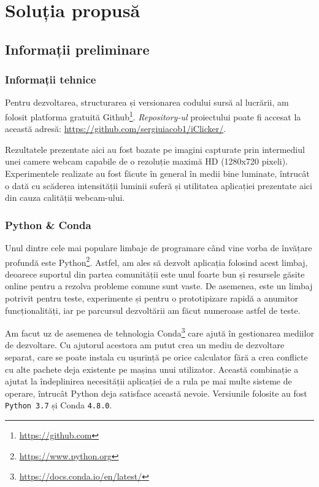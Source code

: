 \chapter{Soluția propusă}
\label{chapter2}
\section{Informații preliminare}
\subsection{Informații tehnice}
Pentru dezvoltarea, structurarea și versionarea codului sursă al lucrării, am folosit platforma gratuită Github\footnote{\url{https://github.com}}.
\emph{Repository-ul} proiectului poate fi accesat la această adresă: \url{https://github.com/sergiuiacob1/iClicker/}.

Rezultatele prezentate aici au fost bazate pe imagini capturate prin intermediul unei camere webcam capabile de o rezoluție maximă HD (1280x720 pixeli).
Experimentele realizate au fost făcute în general în medii bine luminate, întrucât o dată cu scăderea intensității luminii suferă și utilitatea aplicației prezentate aici din cauza calității webcam-ului.

\subsection{Python \& Conda}
Unul dintre cele mai populare limbaje de programare când vine vorba de învățare profundă este Python\footnote{\url{https://www.python.org}}.
Astfel, am ales să dezvolt aplicația folosind acest limbaj, deoarece suportul din partea comunității este unul foarte bun și resursele găsite online pentru a rezolva probleme comune sunt vaste.
De asemenea, este un limbaj potrivit pentru teste, experimente și pentru o prototipizare rapidă a anumitor funcționalități, iar pe parcursul dezvoltării am făcut numeroase astfel de teste.

Am facut uz de asemenea de tehnologia Conda\footnote{\url{https://docs.conda.io/en/latest/}} care ajută în gestionarea mediilor de dezvoltare.
Cu ajutorul acestora am putut crea un mediu de dezvoltare separat, care se poate instala cu ușurință pe orice calculator fără a crea conflicte cu alte pachete deja existente pe mașina unui utilizator.
Această combinație a ajutat la îndeplinirea necesității aplicației de a rula pe mai multe sisteme de operare, întrucât Python deja satisface această nevoie.
Versiunile folosite au fost \lstinline{Python 3.7} și Conda \lstinline{4.8.0}.

